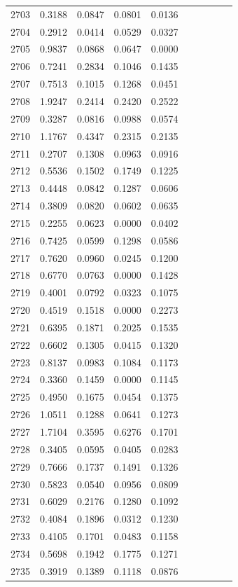 \begin{table}
\begin{tabular}{cccccccccc}
2703& 0.3188& 0.0847& 0.0801& 0.0136\\ 
2704& 0.2912& 0.0414& 0.0529& 0.0327\\ 
2705& 0.9837& 0.0868& 0.0647& 0.0000\\ 
2706& 0.7241& 0.2834& 0.1046& 0.1435\\ 
2707& 0.7513& 0.1015& 0.1268& 0.0451\\ 
2708& 1.9247& 0.2414& 0.2420& 0.2522\\ 
2709& 0.3287& 0.0816& 0.0988& 0.0574\\ 
2710& 1.1767& 0.4347& 0.2315& 0.2135\\ 
2711& 0.2707& 0.1308& 0.0963& 0.0916\\ 
2712& 0.5536& 0.1502& 0.1749& 0.1225\\ 
2713& 0.4448& 0.0842& 0.1287& 0.0606\\ 
2714& 0.3809& 0.0820& 0.0602& 0.0635\\ 
2715& 0.2255& 0.0623& 0.0000& 0.0402\\ 
2716& 0.7425& 0.0599& 0.1298& 0.0586\\ 
2717& 0.7620& 0.0960& 0.0245& 0.1200\\ 
2718& 0.6770& 0.0763& 0.0000& 0.1428\\ 
2719& 0.4001& 0.0792& 0.0323& 0.1075\\ 
2720& 0.4519& 0.1518& 0.0000& 0.2273\\ 
2721& 0.6395& 0.1871& 0.2025& 0.1535\\ 
2722& 0.6602& 0.1305& 0.0415& 0.1320\\ 
2723& 0.8137& 0.0983& 0.1084& 0.1173\\ 
2724& 0.3360& 0.1459& 0.0000& 0.1145\\ 
2725& 0.4950& 0.1675& 0.0454& 0.1375\\ 
2726& 1.0511& 0.1288& 0.0641& 0.1273\\ 
2727& 1.7104& 0.3595& 0.6276& 0.1701\\ 
2728& 0.3405& 0.0595& 0.0405& 0.0283\\ 
2729& 0.7666& 0.1737& 0.1491& 0.1326\\ 
2730& 0.5823& 0.0540& 0.0956& 0.0809\\ 
2731& 0.6029& 0.2176& 0.1280& 0.1092\\ 
2732& 0.4084& 0.1896& 0.0312& 0.1230\\ 
2733& 0.4105& 0.1701& 0.0483& 0.1158\\ 
2734& 0.5698& 0.1942& 0.1775& 0.1271\\ 
2735& 0.3919& 0.1389& 0.1118& 0.0876\\ 

\end{tabular}
\end{table}
